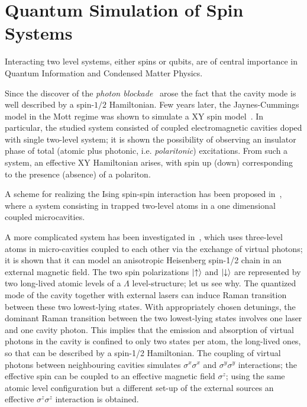 \section{Quantum Simulation of Spin Systems}
Interacting two level systems, either spins or qubits, are of central importance in Quantum Information and Condensed Matter Physics. 

Since the discover of the \emph{photon blockade}~\cite{ph_blockade} arose the fact that the cavity mode is well described by a spin-$1/2$ Hamiltonian. Few years later, the Jaynes-Cummings model in the Mott regime was shown to simulate a XY spin model~\cite{angelakis}. In particular, the studied system consisted of coupled electromagnetic cavities doped with single two-level system; it is shown the possibility of observing an insulator phase of total (atomic plus photonic, i.e. \emph{polaritonic}) excitations. From such a system, an effective XY Hamiltonian arises, with spin up (down) corresponding to the presence (absence) of a polariton.

A scheme for realizing the Ising spin-spin interaction has been proposed in~\cite{LiGuGong}, where a system consisting in trapped two-level atoms in a one dimensional coupled microcavities. 

A more complicated system has been investigated in~\cite{Hartmann_XYZ}, which uses three-level atoms in micro-cavities coupled to each other via the exchange of virtual photons; it is shown that it can model an anisotropic Heisenberg spin-1/2 chain in an external magnetic field. The two spin polarizations $\ket{\uparrow}$ and $\ket{\downarrow}$ are represented by two long-lived atomic levels of a $\Lambda$ level-structure; let us see why. The quantized mode of the cavity together with external lasers can induce Raman transition between these two lowest-lying states.  With appropriately chosen detunings, the dominant Raman transition between the two lowest-lying states involves one laser and one cavity photon. This implies that the emission and absorption of virtual photons in the cavity is confined to only two states per atom, the long-lived ones, so that can be described by a spin-1/2 Hamiltonian. The coupling of virtual photons between neighbouring cavities simulates $\sigma^x\sigma^x$ and $\sigma^y\sigma^y$ interactions; the effective spin can be coupled to an effective magnetic field $\sigma^z$; using the same atomic level configuration but a different set-up of the external sources an effective $\sigma^z\sigma^z$ interaction is obtained.


